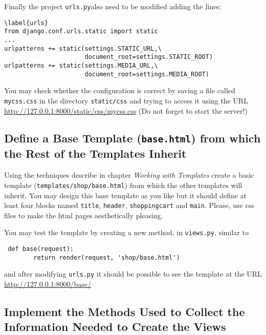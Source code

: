 \documentclass[12pt]{article} %
\newcommand{\ttt}[1]{\texttt{#1}}%
\newcommand{\hhh}[1]{\texttt{#1}}%
\newcommand{\urls}{\texttt{urls.py}}%
\begin{document}
Finally the project \urls also need to be modified adding the lines:

\begin{lstlisting}
\label{urls}
from django.conf.urls.static import static
...
urlpatterns += static(settings.STATIC_URL,\
                      document_root=settings.STATIC_ROOT)
urlpatterns += static(settings.MEDIA_URL,\
                      document_root=settings.MEDIA_ROOT)
\end{lstlisting}

You may check whether the configuration is correct by saving a file called \ttt{mycss.css}
in the directory \texttt{static/css} and trying to access it using the URL
\url{http://127.0.0.1:8000/static/css/mycss.css} (Do not forget to start the server!)

\subsection{Define a Base Template  (\hhh{base.html}) from which the Rest of the Templates  Inherit}
   
   Using the techniques describe in chapter \textit{Working with Templates} create a basic template (\ttt{templates/shop/base.html}) from which the other templates will inherit. 
   You may design this base template as you like but it should define at least four blocks 
   named \ttt{title}, \ttt{header}, \ttt{shoppingcart} and \ttt{main}. Please, use css files to make the html pages aesthetically pleasing.

   You may test the template by creating a new method, in \texttt{views.py}, similar to
   
\begin{verbatim}
 def base(request):
        return render(request, 'shop/base.html')
\end{verbatim}
and after modifying  \urls{} it should be possible to see the template at the URL \url{http://127.0.0.1:8000/base/}

\subsection{Implement the Methods Used to Collect the Information Needed to Create the Views}   

\end{document}
